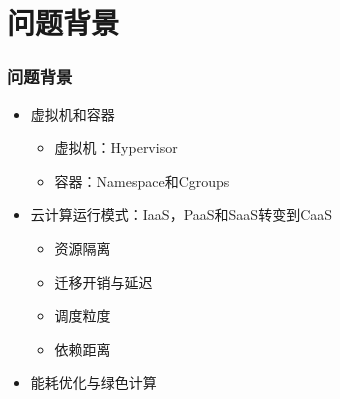 \section{问题背景}

\begin{frame}
\frametitle{问题背景}
\begin{itemize}
    \item<1-> 虚拟机和容器
    \begin{itemize}
        \item<1-> 虚拟机：Hypervisor
        \item<1-> 容器：Namespace和Cgroups
    \end{itemize}
    \item<2-> 云计算运行模式：IaaS，PaaS和SaaS转变到CaaS
    \begin{itemize}
        \item<2-> 资源隔离
        \item<2-> 迁移开销与延迟
        \item<2-> 调度粒度
        \item<2-> 依赖距离
    \end{itemize}
    \item<3-> 能耗优化与绿色计算
\end{itemize}


\end{frame}
